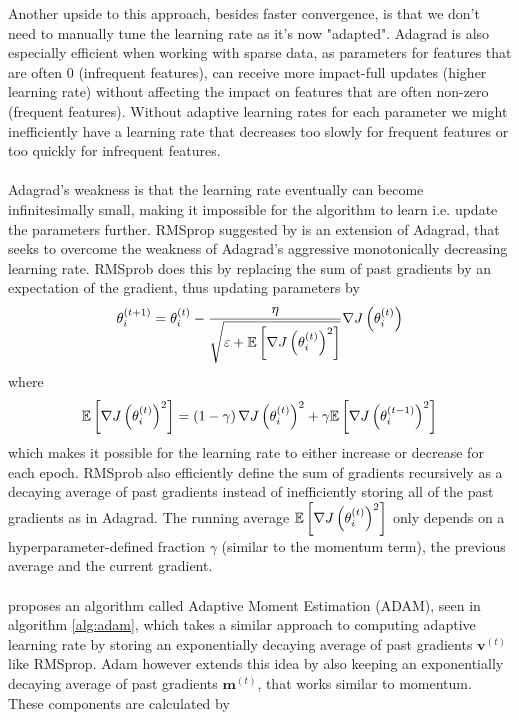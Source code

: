Another upside to this approach, besides faster convergence, is that we don't need to manually tune the learning rate as it's now "adapted". Adagrad is also especially efficient when working with sparse data, as parameters for features that are often $0$ (infrequent features), can receive more impact-full updates (higher learning rate) without affecting the impact on features that are often non-zero (frequent features). Without adaptive learning rates for each parameter we might inefficiently have a learning rate that decreases too slowly for frequent features or too quickly for infrequent features.\\
\\
Adagrad's weakness is that the learning rate eventually can become infinitesimally small, making it impossible for the algorithm to learn i.e. update the parameters further. RMSprop suggested by \cite{Tieleman_Hinton2012} is an extension of Adagrad, that seeks to overcome the weakness of Adagrad's aggressive monotonically decreasing learning rate. RMSprob does this by replacing the sum of past gradients by an expectation of the gradient, thus updating parameters by
\begin{equation*}
    \theta^{(t+1)}_i = \theta^{(t)}_i - \frac{\eta}{\sqrt{\varepsilon + \E \lrs{\nabla J \lr{\theta_i^{(t)}}^2}}} \nabla J \lr{\theta_i^{(t)}}
\end{equation*}
where 
\begin{equation*}
    \E \lrs{\nabla J \lr{\theta_i^{(t)}}^2} = \lr{1 - \gamma}\nabla J \lr{\theta_i^{(t)}}^2 + \gamma \E \lrs{\nabla J \lr{\theta_i^{(t-1)}}^2}
\end{equation*}
which makes it possible for the learning rate to either increase or decrease for each epoch. RMSprob also efficiently define the sum of gradients recursively as a decaying average of past gradients instead of inefficiently storing all of the past gradients as in Adagrad. The running average $\E \lrs{\nabla J \lr{\theta_i^{(t)}}^2}$ only depends on a hyperparameter-defined fraction $\gamma$ (similar to the momentum term), the previous average and the current gradient.\\
\\
\cite{Kingma_Ba_2015} proposes an algorithm called Adaptive Moment Estimation (ADAM), seen in algorithm \ref{alg:adam}, which takes a similar approach to computing adaptive learning rate by storing an exponentially decaying average of past gradients $\boldsymbol{v}^{(t)}$ like RMSprop. Adam however extends this idea by also keeping an exponentially decaying average of past gradients $\boldsymbol{m}^{(t)}$, that works similar to momentum. These components are calculated by 
